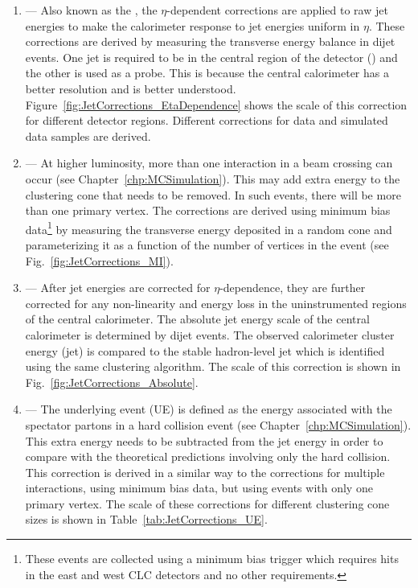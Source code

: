 \vspace{-0.01\textheight}
\begin{singlespace}
\begin{enumerate}
\item{ --- Also known as the , the $\eta$-dependent corrections are applied to raw jet energies to make the calorimeter response to jet energies uniform in $\eta$. These corrections are derived by measuring the transverse energy balance in dijet events. One jet is required to be in the central region of the detector () and the other is used as a probe. This is because the central calorimeter has a better resolution and is better understood. Figure~\ref{fig:JetCorrections_EtaDependence} shows the scale of this correction for different detector regions. Different corrections for data and simulated data samples are derived.}

\item{ --- At higher luminosity, more than one \ppbar interaction in a beam crossing can occur (see Chapter~\ref{chp:MCSimulation}). This may add extra energy to the clustering cone that needs to be removed. In such events, there will be more than one primary vertex. The corrections are derived using minimum bias data\footnote{These events are collected using a minimum bias trigger which requires hits in the east and west CLC detectors and no other requirements.} by measuring the transverse energy deposited in a random cone and parameterizing it as a function of the number of vertices in the event (see Fig.~\ref{fig:JetCorrections_MI}).}

\item{ --- After jet energies are corrected for $\eta$-dependence, they are further corrected for any non-linearity and energy loss in the uninstrumented regions of the central calorimeter. The absolute jet energy scale of the central calorimeter is determined by \pythiaText dijet \MC events. The observed calorimeter cluster energy (jet) is compared to the stable hadron-level jet which is identified using the same clustering algorithm. The scale of this correction is shown in Fig.~\ref{fig:JetCorrections_Absolute}.}

\item{ --- The underlying event (UE) is defined as the energy associated with the spectator partons in a hard collision event (see Chapter~\ref{chp:MCSimulation}). This extra energy needs to be subtracted from the jet energy in order to compare with the theoretical predictions involving only the hard collision. This correction is derived in a similar way to the corrections for multiple \ppbar interactions, using minimum bias data, but using events with only one primary vertex. The scale of these corrections for different clustering cone sizes is shown in Table~\ref{tab:JetCorrections_UE}.}


\end{enumerate}
\end{singlespace}
